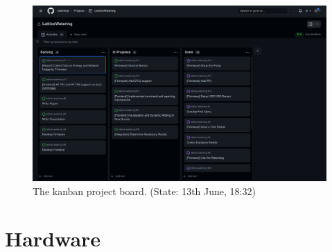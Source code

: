 \documentclass[acmtog, language=english, nonacm]{acmart}
\begin{document}
    \begin{figure}[!hbtp]
        \centering
        \includegraphics[width=\linewidth]{img/kanban_board.png}
        \caption{The kanban project board. (State: 13th June, 18:32)}
        \label{fig:kanban_board}
    \end{figure}

    \label{sec:hardware} \section{Hardware}
\end{document}
